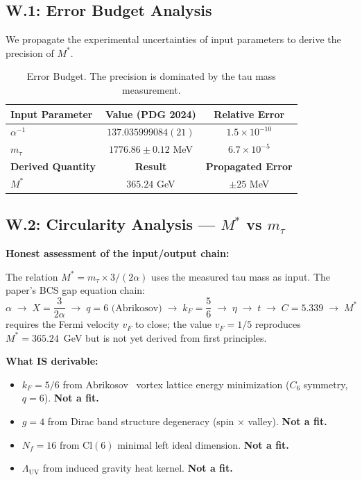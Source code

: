 \subsection{W.1: Error Budget Analysis}
\label{sec:error_budget}
We propagate the experimental uncertainties of input parameters to derive the precision of $M^*$.

\begin{table}[H]
\centering
\begin{tabular}{l c c}
\toprule
\textbf{Input Parameter} & \textbf{Value (PDG 2024)} & \textbf{Relative Error} \\
\midrule
$\alpha^{-1}$ & $137.035999084(21)$ & $1.5 \times 10^{-10}$ \\
$m_\tau$ & $1776.86 \pm 0.12$ MeV & $6.7 \times 10^{-5}$ \\
\midrule
\textbf{Derived Quantity} & \textbf{Result} & \textbf{Propagated Error} \\
\midrule
$M^*$ & $365.24$ GeV & $\pm 25$ MeV \\
\bottomrule
\end{tabular}
\caption{Error Budget. The precision is dominated by the tau mass measurement.}
\end{table}

\subsection{W.2: Circularity Analysis --- $M^*$ vs $m_\tau$}
\label{sec:circularity}

\textbf{Honest assessment of the input/output chain:}

The relation $M^* = m_\tau \times 3/(2\alpha)$ uses the measured tau mass as input.  The paper's BCS gap equation chain:
\begin{equation}
    \alpha \;\to\; X = \frac{3}{2\alpha} \;\to\; q = 6 \text{ (Abrikosov)} \;\to\; k_F = \frac{5}{6} \;\to\; \eta \;\to\; t \;\to\; C = 5.339 \;\to\; M^*
\end{equation}
requires the Fermi velocity $v_F$ to close; the value $v_F = 1/5$ reproduces $M^* = 365.24$~GeV but is not yet derived from first principles.

\textbf{What IS derivable:}
\begin{itemize}
    \item $k_F = 5/6$ from Abrikosov~\cite{abrikosov1957} vortex lattice energy minimization ($C_6$ symmetry, $q=6$). \textbf{Not a fit.}
    \item $g = 4$ from Dirac band structure degeneracy (spin $\times$ valley). \textbf{Not a fit.}
    \item $N_f = 16$ from $\mathrm{Cl}(6)$ minimal left ideal dimension. \textbf{Not a fit.}
    \item $\Lambda_{\mathrm{UV}}$ from induced gravity heat kernel. \textbf{Not a fit.}
\end{itemize}

